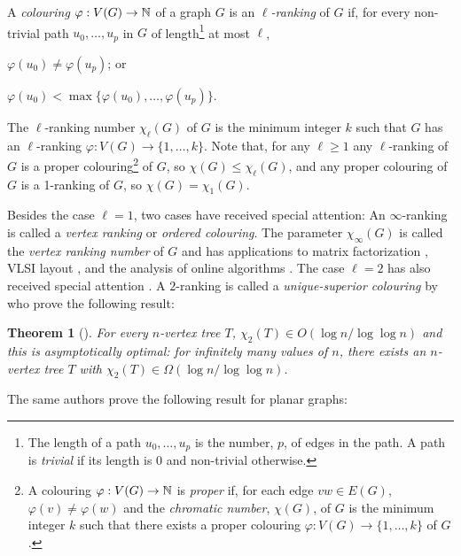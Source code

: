 \documentclass[kpfonts]{patmorin}
\newcommand{\trn}{\chi_2}
\newtheorem{othertheorem}{Theorem}
\theoremstyle{named}
\begin{document}
A \emph{colouring} $\varphi:V(G)\to \mathbb{N}$ of a graph $G$ is an \emph{$\ell$-ranking} of $G$ if, for every non-trivial path $u_0,\ldots,u_p$ in $G$ of length\footnote{The length of a path $u_0,\ldots,u_p$ is the number, $p$, of edges in the path. A path is \emph{trivial} if its length is 0 and non-trivial otherwise.} at most $\ell$,
\begin{inparaenum}[(i)]
    \item $\varphi(u_0)\neq\varphi(u_p)$; or \item $\varphi(u_0)<\max\{\varphi(u_0),\ldots,\varphi(u_p)\}$.
\end{inparaenum}
The $\ell$-ranking number $\chi_\ell(G)$ of $G$ is the minimum integer $k$ such that $G$ has an $\ell$-ranking $\varphi:V(G)\to \{1,\ldots,k\}$.  Note that, for any $\ell\ge 1$ any $\ell$-ranking of $G$ is a proper colouring\footnote{A colouring $\varphi:V(G)\to \mathbb{N}$ is \emph{proper} if, for each edge $vw\in E(G)$, $\varphi(v)\neq\varphi(w)$ and the \emph{chromatic number}, $\chi(G)$, of $G$ is the minimum integer $k$ such that there exists a proper colouring $\varphi:V(G)\to\{1,\ldots,k\}$ of $G$.} of $G$, so $\chi(G)\le \chi_\ell(G)$, and any proper colouring of $G$ is a 1-ranking of $G$, so $\chi(G)=\chi_1(G)$.

Besides the case $\ell=1$, two cases have received special attention: An $\infty$-ranking is called a \emph{vertex ranking} or \emph{ordered colouring}. The parameter $\chi_\infty(G)$ is called the \emph{vertex ranking number} of $G$ and has applications to matrix factorization \cite{bodlaender.gilbert.ea:approximating,duff.reid:multifrontal,liu:role,dereniowski.kubale:cholesky}, VLSI layout \cite{leiserson:area,sen.deng.ea:on}, and the analysis of online algorithms \cite{even.smorodinsky:hitting}. The case $\ell=2$ has also received special attention \cite{almeter.demircan.ea:graph,karpas.neiman.ea:on,shalu.antony:complexity}. A $2$-ranking is called a \emph{unique-superior colouring} by \citet{karpas.neiman.ea:on} who prove the following result:

\setcounter{othertheorem}{19}
\begin{othertheorem}[\cite{karpas.neiman.ea:on}]\label{trees}
    For every $n$-vertex tree $T$, $\trn(T)\in O(\log n/\log\log n)$ and this is asymptotically optimal: for infinitely many values of $n$, there exists an $n$-vertex tree $T$ with $\trn(T)\in\Omega(\log n/\log\log n)$.
\end{othertheorem}

The same authors prove the following result for planar graphs:
\end{document}

